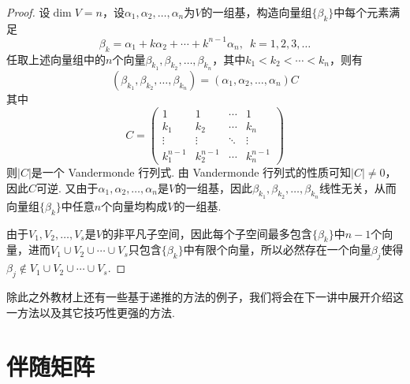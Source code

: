 \begin{proof}
    设$\dim V=n$，设$\alpha_1,\alpha_2,\ldots,\alpha_n$为$V$的一组基，构造向量组$\{\beta_k\}$中每个元素满足
    \[\beta_k=\alpha_1+k\alpha_2+\cdots+k^{n-1}\alpha_n,\enspace k=1,2,3,\ldots\]
    任取上述向量组中的$n$个向量$\beta_{k_1},\beta_{k_2},\ldots,\beta_{k_n}$，其中$k_1<k_2<\cdots<k_n$，则有
    \[(\beta_{k_1},\beta_{k_2},\ldots,\beta_{k_n})=(\alpha_1,\alpha_2,\ldots,\alpha_n)C\]
    其中
    \[C=\begin{pmatrix}
            1         & 1         & \cdots & 1         \\
            k_1       & k_2       & \cdots & k_n       \\
            \vdots    & \vdots    & \ddots & \vdots    \\
            k_1^{n-1} & k_2^{n-1} & \cdots & k_n^{n-1}
        \end{pmatrix}\]
    则$|C|$是一个 Vandermonde 行列式. 由 Vandermonde 行列式的性质可知$|C| \neq 0$，因此$C$可逆. 又由于$\alpha_1,\alpha_2,\ldots,\alpha_n$是$V$的一组基，因此$\beta_{k_1},\beta_{k_2},\ldots,\beta_{k_n}$线性无关，从而向量组$\{\beta_k\}$中任意$n$个向量均构成$V$的一组基.

    由于$V_1,V_2,\ldots,V_s$是$V$的非平凡子空间，因此每个子空间最多包含$\{\beta_k\}$中$n-1$个向量，进而$V_1\cup V_2\cup\cdots\cup V_s$只包含$\{\beta_k\}$中有限个向量，所以必然存在一个向量$\beta_j$使得$\beta_j \notin V_1\cup V_2\cup\cdots\cup V_s$.
\end{proof}

除此之外教材上还有一些基于递推的方法的例子，我们将会在下一讲中展开介绍这一方法以及其它技巧性更强的方法.

\section{伴随矩阵}

